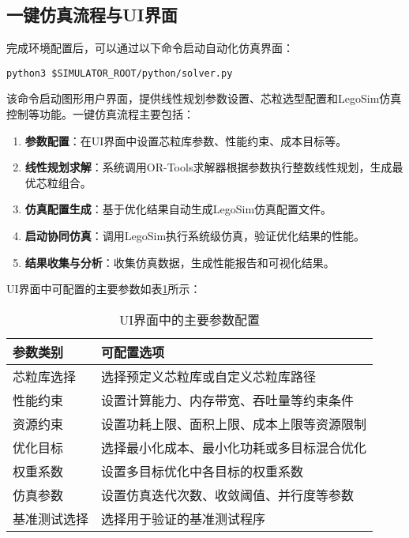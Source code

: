 \documentclass[bachelor]{thesis-uestc}
\begin{document}
\subsection{一键仿真流程与UI界面}

完成环境配置后，可以通过以下命令启动自动化仿真界面：

\begin{verbatim}
python3 $SIMULATOR_ROOT/python/solver.py
\end{verbatim}

该命令启动图形用户界面，提供线性规划参数设置、芯粒选型配置和LegoSim仿真控制等功能。一键仿真流程主要包括：

\begin{enumerate}
    \item \textbf{参数配置}：在UI界面中设置芯粒库参数、性能约束、成本目标等。
    \item \textbf{线性规划求解}：系统调用OR-Tools求解器根据参数执行整数线性规划，生成最优芯粒组合。
    \item \textbf{仿真配置生成}：基于优化结果自动生成LegoSim仿真配置文件。
    \item \textbf{启动协同仿真}：调用LegoSim执行系统级仿真，验证优化结果的性能。
    \item \textbf{结果收集与分析}：收集仿真数据，生成性能报告和可视化结果。
\end{enumerate}

UI界面中可配置的主要参数如表\ref{tab:ui_parameters}所示：

\begin{table}[htbp]
\caption{UI界面中的主要参数配置}
\centering
\begin{tabular}{|l|p{10cm}|}
\hline
\textbf{参数类别} & \textbf{可配置选项} \\
\hline
芯粒库选择 & 选择预定义芯粒库或自定义芯粒库路径 \\
\hline
性能约束 & 设置计算能力、内存带宽、吞吐量等约束条件 \\
\hline
资源约束 & 设置功耗上限、面积上限、成本上限等资源限制 \\
\hline
优化目标 & 选择最小化成本、最小化功耗或多目标混合优化 \\
\hline
权重系数 & 设置多目标优化中各目标的权重系数 \\
\hline
仿真参数 & 设置仿真迭代次数、收敛阈值、并行度等参数 \\
\hline
基准测试选择 & 选择用于验证的基准测试程序 \\
\hline
\end{tabular}
\label{tab:ui_parameters}
\end{table}
\end{document}
